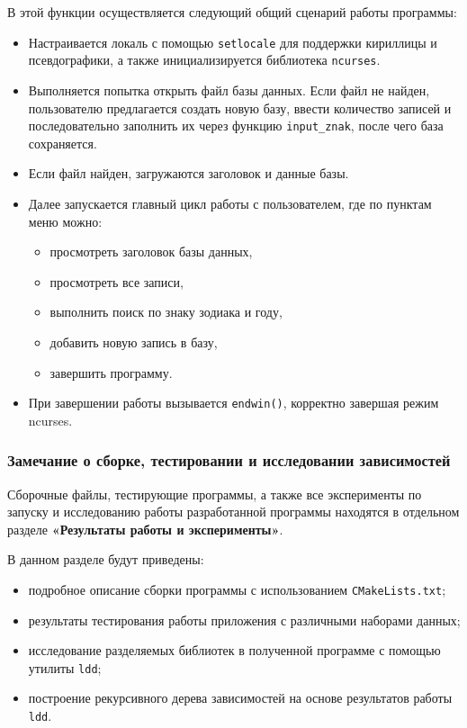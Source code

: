 \vspace{0.2cm}

В этой функции осуществляется следующий общий сценарий работы программы:
\begin{itemize}
    \item Настраивается локаль с помощью \texttt{setlocale} для поддержки кириллицы и псевдографики, а также инициализируется библиотека \texttt{ncurses}.
    \item Выполняется попытка открыть файл базы данных. Если файл не найден, пользователю предлагается создать новую базу, ввести количество записей и последовательно заполнить их через функцию \texttt{input\_znak}, после чего база сохраняется.
    \item Если файл найден, загружаются заголовок и данные базы.
    \item Далее запускается главный цикл работы с пользователем, где по пунктам меню можно:
    \begin{itemize}
        \item просмотреть заголовок базы данных,
        \item просмотреть все записи,
        \item выполнить поиск по знаку зодиака и году,
        \item добавить новую запись в базу,
        \item завершить программу.
    \end{itemize}
    \item При завершении работы вызывается \texttt{endwin()}, корректно завершая режим ncurses.
\end{itemize}


\subsubsection*{Замечание о сборке, тестировании и исследовании зависимостей}

Сборочные файлы, тестирующие программы, а также все эксперименты по запуску и исследованию работы разработанной программы находятся в отдельном разделе \textbf{«Результаты работы и эксперименты»}.

\vspace{0.3cm}

В данном разделе будут приведены:
\begin{itemize}
    \item подробное описание сборки программы с использованием \texttt{CMakeLists.txt};
    \item результаты тестирования работы приложения с различными наборами данных;
    \item исследование разделяемых библиотек в полученной программе с помощью утилиты \texttt{ldd};
    \item построение рекурсивного дерева зависимостей на основе результатов работы \texttt{ldd}.
\end{itemize}